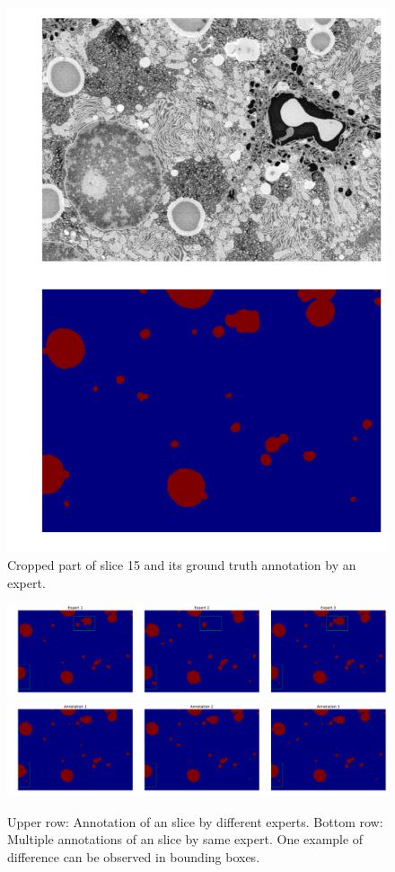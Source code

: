 \begin{figure}[h!] \label{fig:2dslice}
 \includegraphics[width=0.7\linewidth]{figures/ex_slice.pdf}
\caption{Cropped part of slice 15 and its ground truth annotation by an expert.}
\end{figure}

\begin{figure}[h!] \label{fig:diffexperts}
 \includegraphics[width=1.0\linewidth]{figures/different_expert.pdf} \\
  \includegraphics[width=1.0\linewidth]{figures/same_expert.pdf}
\caption{Upper row: Annotation of an slice by different experts. Bottom row: Multiple annotations of an slice by same expert. One example of difference can be observed in bounding boxes.}
\end{figure}

